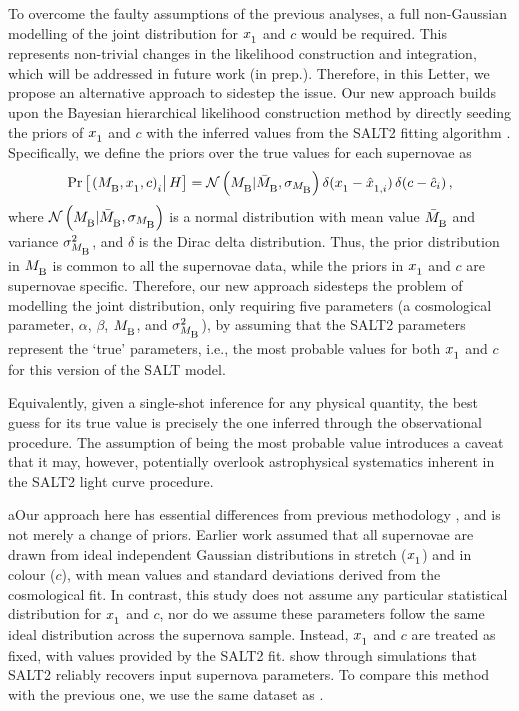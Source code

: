 \documentclass[fleqn,usenatbib]{mnras}
\newcommand{\prior}{\mathrm{Pr}}
\newcommand{\Z}[1]{_{\lower2pt\hbox{$\scriptstyle#1$}}}
\newcommand{\Ns}[1]{_{\lower2pt\hbox{$\scriptstyle\rm#1$}}}
\begin{document}
To overcome the faulty assumptions of the previous analyses, a full non-Gaussian modelling of the joint distribution for $x\Z1$ and $c$ would be required. This represents non-trivial changes in the likelihood construction and integration, which will be addressed in future work (in prep.).
Therefore, in this Letter, we propose an alternative approach to sidestep the issue. Our new approach builds upon the Bayesian hierarchical likelihood construction method by directly seeding the priors of $x\Z1$ and $c$ with the inferred values from the SALT2 fitting algorithm \citep{Guy_2005, Guy_2007, Taylor_2021}. Specifically, we define the priors over the true values for each supernovae as 
\begin{equation}
    \prior\left[\left.(M\Ns{B}, x\Z 1, c) \Z i \right| H\right] = \mathcal{N}\left(M\Ns{B}|\bar{M}\Ns{B},\sigma_{M\Ns{B}}\right)\delta(x\Z 1-\hat{x}\Z {1,i})\,\delta(c-\hat{c}_{i}) \, ,
\end{equation}
where $\mathcal{N}\left(M\Ns{B}|\bar{M}\Ns{B},\sigma_{M\Ns{B}}\right)$ is a normal distribution with mean value $\bar{M}\Ns{B}$ and variance $\sigma_{M\Ns{B}}^2$, and $\delta$ is the Dirac delta distribution. Thus, the prior distribution in $M\Ns{B}$ is common to all the supernovae data, while the priors in $x\Z1$ and $c$ are supernovae specific. Therefore, our new approach sidesteps the problem of modelling the joint distribution, only requiring five parameters (a cosmological parameter, $\alpha$, $\beta$, $M\Ns B$, and $\sigma^2_{M\Ns B}$), by assuming that the SALT2 parameters represent the `true' parameters, i.e., the most probable values for both $x \Z 1$ and $c$ for this version of the SALT model.

Equivalently, given a single-shot inference for any physical quantity, the best guess for its true value is precisely the one inferred through the observational procedure. The assumption of being the most probable value introduces a caveat that it may, however, potentially overlook astrophysical systematics inherent in the SALT2 light curve procedure.

aOur approach here has essential differences from previous methodology \citep{Nielsen_2016, Dam_2017, Lane_2023}, and is not merely a change of priors. Earlier work assumed that all supernovae are drawn from ideal independent Gaussian distributions in stretch ($x\Z 1$) and in colour ($c$), with mean values and standard deviations derived from the cosmological fit. In contrast, this study does not assume any particular statistical distribution for $x\Z 1$ and $c$, nor do we assume these parameters follow the same ideal distribution across the supernova sample. Instead, $x\Z 1$ and $c$ are treated as fixed, with values provided by the SALT2 fit. \citet{Taylor_2021} show through simulations that SALT2 reliably recovers input supernova parameters. To compare this method with the previous one, we use the same dataset as \citet{Lane_2023}.
\end{document}
